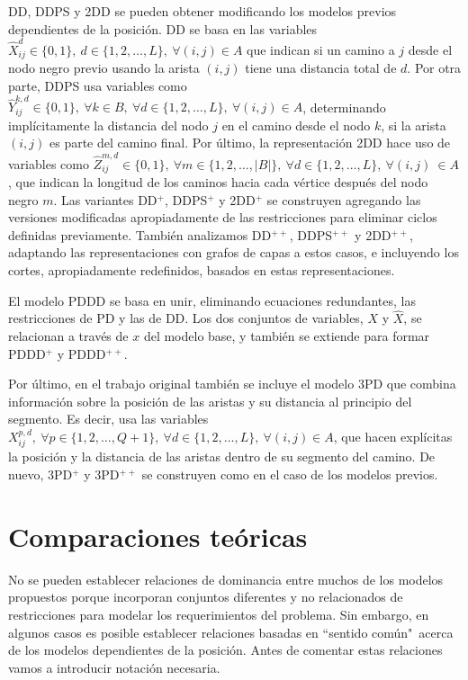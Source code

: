 \documentclass[10pt, a4paper]{article}
\theoremstyle{definition}
\begin{document}
DD, DDPS y 2DD se pueden obtener modificando los modelos previos dependientes de la posición. DD se basa en las variables $\hat{X}_{ij}^{d} \in \{0,1\},\ d \in \{1,2,\dots,L\},\ \forall(i,j) \in A$ que indican si un camino a $j$ desde el nodo negro previo usando la arista $(i,j)$ tiene una distancia total de $d$. Por otra parte, DDPS usa variables como $\hat{Y}_{ij}^{k,d} \in \{0,1\},\ \forall k \in B,\ \forall d \in \{1,2,\dots,L\},\ \forall (i,j) \in A$, determinando implícitamente la distancia del nodo $j$ en el camino desde el nodo $k$, si la arista $(i,j)$ es parte del camino final. Por último, la representación 2DD hace uso de variables como $\hat{Z}_{ij}^{m,d} \in \{0,1\},\ \forall m \in \{1,2,\dots,|B|\},\ \forall d \in \{1,2,\dots,L\},\ \forall(i,j)\ \in A$, que indican la longitud de los caminos hacia cada vértice después del nodo negro $m$. Las variantes DD$^{+}$, DDPS$^{+}$ y 2DD$^{+}$ se construyen agregando las versiones modificadas apropiadamente de las restricciones para eliminar ciclos definidas previamente. También analizamos DD$^{++}$, DDPS$^{++}$ y 2DD$^{++}$, adaptando las representaciones con grafos de capas a estos casos, e incluyendo los cortes, apropiadamente redefinidos, basados en estas representaciones.

El modelo PDDD se basa en unir, eliminando ecuaciones redundantes, las restricciones de PD y las de DD. Los dos conjuntos de variables, $X$ y $\hat{X}$, se relacionan a través de $x$ del modelo base, y también se extiende para formar PDDD$^{+}$ y PDDD$^{++}$.

Por último, en el trabajo original también se incluye el modelo 3PD que combina información sobre la posición de las aristas y su distancia al principio del segmento. Es decir, usa las variables $X_{ij}^{p,d},\ \forall p \in \{1,2,\dots,Q+1\},\ \forall d \in \{1,2,\dots,L\},\ \forall (i,j) \in A$, que hacen explícitas la posición y la distancia de las aristas dentro de su segmento del camino. De nuevo, 3PD$^{+}$ y 3PD$^{++}$ se construyen como en el caso de los modelos previos.

\section{Comparaciones teóricas}

No se pueden establecer relaciones de dominancia entre muchos de los modelos propuestos porque incorporan conjuntos diferentes y no relacionados de restricciones para modelar los requerimientos del problema. Sin embargo, en algunos casos es posible establecer relaciones basadas en “sentido común"\ acerca de los modelos dependientes de la posición. Antes de comentar estas relaciones vamos a introducir notación necesaria.
\end{document}
